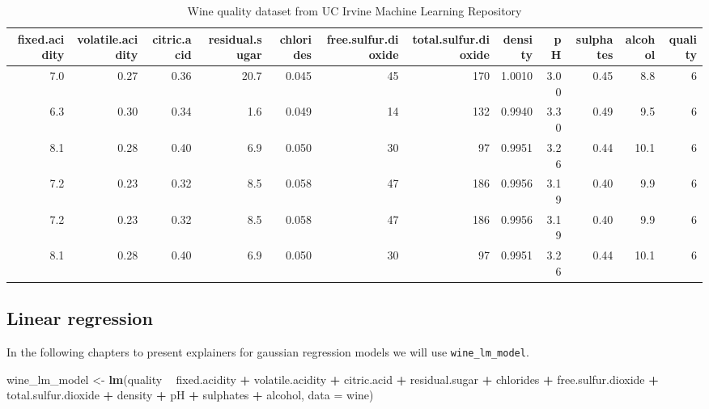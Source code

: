 \documentclass[]{book}
\newenvironment{Shaded}{\begin{snugshade}}{\end{snugshade}}
\newcommand{\KeywordTok}[1]{\textcolor[rgb]{0.13,0.29,0.53}{\textbf{#1}}}
\newcommand{\DataTypeTok}[1]{\textcolor[rgb]{0.13,0.29,0.53}{#1}}
\newcommand{\StringTok}[1]{\textcolor[rgb]{0.31,0.60,0.02}{#1}}
\newcommand{\OperatorTok}[1]{\textcolor[rgb]{0.81,0.36,0.00}{\textbf{#1}}}
\newcommand{\NormalTok}[1]{#1}
\theoremstyle{definition}
\theoremstyle{definition}
\theoremstyle{definition}
\theoremstyle{remark}
\begin{document}
\begin{table}

\caption{\label{tab:wineQuality}Wine quality dataset from UC Irvine Machine Learning Repository}
\centering
\begin{tabular}[t]{r|r|r|r|r|r|r|r|r|r|r|r}
\hline
fixed.acidity & volatile.acidity & citric.acid & residual.sugar & chlorides & free.sulfur.dioxide & total.sulfur.dioxide & density & pH & sulphates & alcohol & quality\\
\hline
7.0 & 0.27 & 0.36 & 20.7 & 0.045 & 45 & 170 & 1.0010 & 3.00 & 0.45 & 8.8 & 6\\
\hline
6.3 & 0.30 & 0.34 & 1.6 & 0.049 & 14 & 132 & 0.9940 & 3.30 & 0.49 & 9.5 & 6\\
\hline
8.1 & 0.28 & 0.40 & 6.9 & 0.050 & 30 & 97 & 0.9951 & 3.26 & 0.44 & 10.1 & 6\\
\hline
7.2 & 0.23 & 0.32 & 8.5 & 0.058 & 47 & 186 & 0.9956 & 3.19 & 0.40 & 9.9 & 6\\
\hline
7.2 & 0.23 & 0.32 & 8.5 & 0.058 & 47 & 186 & 0.9956 & 3.19 & 0.40 & 9.9 & 6\\
\hline
8.1 & 0.28 & 0.40 & 6.9 & 0.050 & 30 & 97 & 0.9951 & 3.26 & 0.44 & 10.1 & 6\\
\hline
\end{tabular}
\end{table}

\subsection{Linear regression}\label{linear-regression}

In the following chapters to present explainers for gaussian regression
models we will use \texttt{wine\_lm\_model}.

\begin{Shaded}
\begin{Highlighting}[]
\NormalTok{wine_lm_model <-}\StringTok{ }\KeywordTok{lm}\NormalTok{(quality }\OperatorTok{~}\StringTok{ }\NormalTok{fixed.acidity }\OperatorTok{+}\StringTok{ }\NormalTok{volatile.acidity }\OperatorTok{+}\StringTok{ }\NormalTok{citric.acid }\OperatorTok{+}\StringTok{ }\NormalTok{residual.sugar }\OperatorTok{+}\StringTok{ }\NormalTok{chlorides }\OperatorTok{+}\StringTok{ }\NormalTok{free.sulfur.dioxide }\OperatorTok{+}\StringTok{ }\NormalTok{total.sulfur.dioxide }\OperatorTok{+}\StringTok{ }\NormalTok{density }\OperatorTok{+}\StringTok{ }\NormalTok{pH }\OperatorTok{+}\StringTok{ }\NormalTok{sulphates }\OperatorTok{+}\StringTok{ }\NormalTok{alcohol,}
               \DataTypeTok{data =}\NormalTok{ wine)}
\end{Highlighting}
\end{Shaded}
\end{document}
